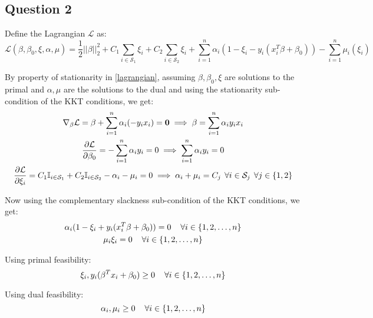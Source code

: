\documentclass{article}
\newcommand{\indi}{\mathbb{I}}
\newcommand{\setS}{\mathcal{S}}
\newcommand{\lagL}{\mathcal{L}}
\begin{document}
\subsection*{Question 2}
\begin{flushleft}
Define the Lagrangian \(\mathcal{L}\) as:
\begin{equation}
\label{lagrangian}
\displaystyle \lagL(\beta, \beta_{0}, \xi, \alpha, \mu) = \frac{1}{2}||\beta||_{2}^{2} + C_{1}\sum_{i \in \setS_{1}}\xi_{i} + C_{2}\sum_{i \in \setS_{2}}\xi_{i} + \sum_{i=1}^{n}\alpha_{i}(1 - \xi_{i} - y_{i}(x_{i}^{T}\beta + \beta_{0})) - \sum_{i=1}^{n}\mu_{i}(\xi_{i})
\end{equation}

By property of stationarity in \ref{lagrangian}, assuming \(\beta, \beta_{0}, \xi\) are solutions to the primal and \(\alpha, \mu\) are the solutions to the dual and using the stationarity sub-condition of the KKT conditions, we get:
\begin{gather}
\label{stationarity-beta}
\displaystyle \nabla_{\beta} \lagL = \beta + \sum_{i=1}^{n}\alpha_{i}(-y_{i}x_{i}) = \mathbf{0} \implies \beta = \sum_{i=1}^{n}\alpha_{i}y_{i}x_{i} \\
\label{stationarity-beta-0}
\displaystyle \frac{\partial \lagL}{\partial \beta_{0}} = -\sum_{i=1}^{n}\alpha_{i}y_{i} = 0 \implies \sum_{i=1}^{n}\alpha_{i}y_{i} = 0 \\
\label{stationarity-xi}
\displaystyle \frac{\partial \lagL}{\partial \xi_{i}} = C_{1}\indi_{i \in \setS_{1}} + C_{2}\indi_{i \in \setS_{2}} - \alpha_{i} - \mu_{i} = 0 \implies \alpha_{i} + \mu_{i} = C_{j} \hspace{1.5mm} \forall i \in \setS_{j} \hspace{1.5mm} \forall j \in \{1, 2\}
\end{gather}

Now using the complementary slackness sub-condition of the KKT conditions, we get:
\begin{gather}
\label{compl-slack-alpha}
\displaystyle \alpha_{i}(1 - \xi_{i} + y_{i}(x_{i}^{T}\beta + \beta_{0})) = 0 \hspace{4mm} \forall i \in \{1, 2, \ldots, n\} \\
\label{compl-slack-mu}
\displaystyle \mu_{i}\xi_{i} = 0 \hspace{4mm} \forall i \in \{1, 2, \ldots, n\}
\end{gather}

Using primal feasibility:
\begin{equation}
\label{primal-fease}
\xi_{i}, y_{i}(\beta^{T}x_{i} + \beta_{0}) \geq 0 \hspace{4mm} \forall i \in \{1, 2, \ldots, n\}
\end{equation}

Using dual feasibility:
\begin{equation}
\label{dual-fease}
\alpha_{i}, \mu_{i} \geq 0 \hspace{4mm} \forall i \in \{1, 2, \ldots, n\}
\end{equation}
\end{flushleft}
\end{document}
